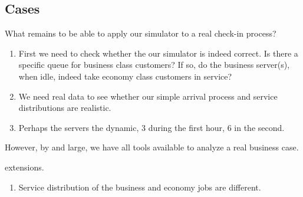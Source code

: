 \subsection{Cases}
\label{sec:cases}




\begin{exercise}
  What remains to be able to apply our simulator to a real check-in process?
  \begin{solution}
    \begin{enumerate}
    \item First we need to check whether the our simulator is indeed correct. Is there a specific queue for business class customers? If so, do the business server(s), when idle, indeed take economy class customers in service? 
    \item We need real data to see whether our simple arrival process and service distributions are realistic. 
    \item Perhaps the servers the dynamic, 3 during the first hour, 6 in the second. 
    \end{enumerate}

However, by and large, we have all tools available to analyze a real business case.
  \end{solution}
\end{exercise}

extensions.
\begin{enumerate}
\item Service distribution of the business and economy jobs are different.
\end{enumerate}













